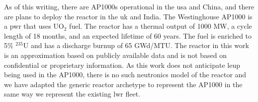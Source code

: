 As of this writing, there are AP1000s operational in the \gls{usa} and China, and there are plans to deploy the reactor in the \gls{uk} and India. The Westinghouse AP1000 is a \gls{pwr} that uses UO$_2$ fuel. The reactor has a thermal output of 1000 MW, a cycle length of 18 months, and an expected lifetime of 60 years. The fuel is enriched to 5\% $^{235}$U and has a discharge burnup of 65 GWd/MTU. The reactor in this work is an approximation based on publicly available data and is not based on confidential or proprietary information. As this work does not anticipate \gls{leup} being used in the AP1000, there is no such neutronics model of the reactor and we have adapted the generic \cycamore reactor archetype to represent the AP1000 in the same way we represent the existing \gls{lwr} fleet.

